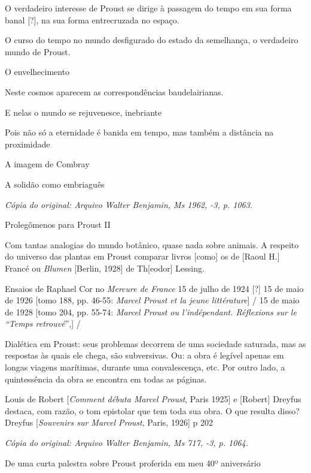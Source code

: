 O verdadeiro interesse de Proust se dirige à passagem do tempo em sua
forma banal {[}?{]}, na sua forma entrecruzada no espaço.

O curso do tempo no mundo desfigurado do estado da semelhança, o
verdadeiro mundo de Proust.

O envelhecimento

Neste cosmos aparecem as correspondências baudelairianas.

E nelas o mundo se rejuvenesce, inebriante

Pois não só a eternidade é banida em tempo, mas também a distância na
proximidade

A imagem de Combray

A solidão como embriaguês


\begin{flushright}
\emph{\small{Cópia do original: Arquivo Walter Benjamin, Ms 1962, -3, p. 1063.}}
\end{flushright}

Prolegômenos para Proust II

Com tantas analogias do mundo botânico, quase nada sobre animais. A
respeito do universo das plantas em Proust comparar livros {[}como{]} os
de {[}Raoul H.{]} Francé ou \emph{Blumen} {[}Berlin, 1928{]} de Th{[}eodor{]} Lessing.

Ensaios de Raphael Cor no \emph{Mercure de France} 15 de julho de 1924
{[}?{]} 15 de maio de 1926 {[}tomo 188, pp. 46-55: \emph{Marcel Proust et
la jeune littérature}{]} / 15 de maio de 1928 {[}tomo 204, pp. 55-74:
\emph{Marcel Proust ou l'indépendant. Réflexions sur le ``Temps
retrouvé}'',{]} /

Dialética em Proust: seus problemas decorrem de uma sociedade saturada,
mas as respostas às quais ele chega, são subversivas. Ou: a obra é
legível apenas em longas viagens marítimas, durante uma convalescença,
etc. Por outro lado, a quintessência da obra se encontra em todas as
páginas.

Louis de Robert {[}\emph{Comment débuta Marcel Proust}, Paris 1925{]} e
{[}Robert{]} Dreyfus destaca, com razão, o tom epistolar que tem toda
sua obra. O que resulta disso? Dreyfus {[}\emph{Souvenirs sur Marcel
Proust}, Paris, 1926{]} p 202

\begin{flushright}
\emph{\small{Cópia do original: Arquivo Walter Benjamin, Ms 717, -3, p. 1064.}}
\end{flushright}

De uma curta palestra sobre Proust proferida em meu 40º aniversário

